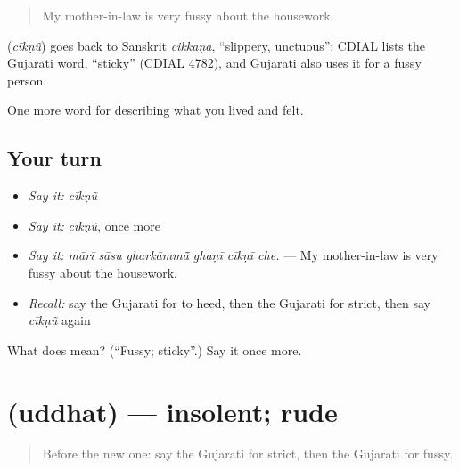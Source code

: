 \begin{quote}
My mother-in-law is very fussy about the housework.
\end{quote}

\begin{cousinweb}
\textbf{} (\emph{cīkṇũ}) goes back to Sanskrit \emph{cikkaṇa}, \textquotedblleft{}slippery, unctuous\textquotedblright{}; CDIAL lists the Gujarati word, \textquotedblleft{}sticky\textquotedblright{} (CDIAL 4782), and Gujarati also uses it for a fussy person.
\end{cousinweb}

\begin{grammarlens}[title={What you've built}]
One more word for describing what you lived and felt.
\end{grammarlens}

\subsection*{Your turn}
\begin{itemize}
\raggedright
  \item \emph{Say it:} \emph{cīkṇũ}
  \item \emph{Say it:} \emph{cīkṇũ}, once more
  \item \emph{Say it:} \emph{mārī sāsu gharkāmmā̃ ghaṇī cīkṇī che.} — My mother-in-law is very fussy about the housework.
  \item \emph{Recall:} say the Gujarati for to heed, then the Gujarati for strict, then say \emph{cīkṇũ} again
\end{itemize}

\begin{tcolorbox}[breakable,colback=teal!4,colframe=teal!35!black,title={Before you move on}]
What does  mean? (\textquotedblleft{}Fussy; sticky\textquotedblright{}.) Say it once more.
\end{tcolorbox}
\section[\texorpdfstring{\gu{ઉદ્ધત} (uddhat)}{ઉદ્ધત (uddhat)}]{ (uddhat) — insolent; rude}

\label{lesson:GU-C465-uddhat}



\begin{quote}
Before the new one: say the Gujarati for strict, then the Gujarati for fussy.
\end{quote}

